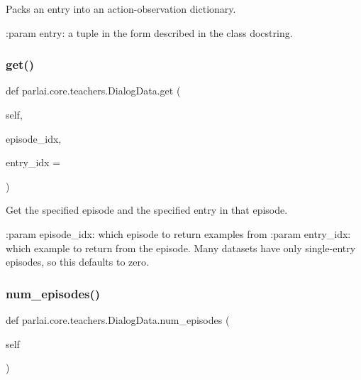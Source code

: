 \begin{DoxyVerb}Packs an entry into an action-observation dictionary.

:param entry: a tuple in the form described in the class docstring.
\end{DoxyVerb}
 \mbox{\label{classparlai_1_1core_1_1teachers_1_1DialogData_a1e037df2f18a67503db657ae4cc27ab4}} 
\subsubsection{\texorpdfstring{get()}{get()}}
{\footnotesize\ttfamily def parlai.\+core.\+teachers.\+Dialog\+Data.\+get (\begin{DoxyParamCaption}\item[{}]{self,  }\item[{}]{episode\+\_\+idx,  }\item[{}]{entry\+\_\+idx = {} }\end{DoxyParamCaption})}

\begin{DoxyVerb}Get the specified episode and the specified entry in that episode.

:param episode_idx:
    which episode to return examples from
:param entry_idx:
    which example to return from the episode. Many datasets have only
    single-entry episodes, so this defaults to zero.
\end{DoxyVerb}
 \mbox{\label{classparlai_1_1core_1_1teachers_1_1DialogData_a83e3457f29a54ec455ad76f7eab6cfc4}} 
\subsubsection{\texorpdfstring{num\+\_\+episodes()}{num\_episodes()}}
{\footnotesize\ttfamily def parlai.\+core.\+teachers.\+Dialog\+Data.\+num\+\_\+episodes (\begin{DoxyParamCaption}\item[{}]{self }\end{DoxyParamCaption})}

